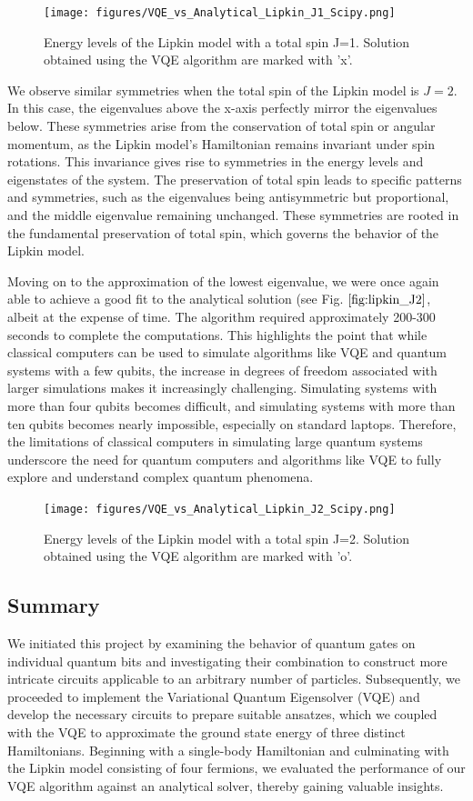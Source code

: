\documentclass[onecolumn,10pt,cleanfoot]{asme2ej}
\begin{document}
\begin{figure}[H]
  \centering
	\texttt{[image: figures/VQE\_vs\_Analytical\_Lipkin\_J1\_Scipy.png]}
	\caption{Energy levels of the Lipkin model with a total spin J=1. Solution obtained using the VQE algorithm are marked with 'x'.}
  \label{fig:lipkin_J1}
\end{figure}

We observe similar symmetries when the total spin of the Lipkin model is $J=2$. In this case, the eigenvalues above the x-axis perfectly mirror the eigenvalues below. These symmetries arise from the conservation of total spin or angular momentum, as the Lipkin model's Hamiltonian remains invariant under spin rotations. This invariance gives rise to symmetries in the energy levels and eigenstates of the system. The preservation of total spin leads to specific patterns and symmetries, such as the eigenvalues being antisymmetric but proportional, and the middle eigenvalue remaining unchanged. These symmetries are rooted in the fundamental preservation of total spin, which governs the behavior of the Lipkin model.

Moving on to the approximation of the lowest eigenvalue, we were once again able to achieve a good fit to the analytical solution (see Fig. $\ref{fig:lipkin_J2}$, albeit at the expense of time. The algorithm required approximately 200-300 seconds to complete the computations. This highlights the point that while classical computers can be used to simulate algorithms like VQE and quantum systems with a few qubits, the increase in degrees of freedom associated with larger simulations makes it increasingly challenging. Simulating systems with more than four qubits becomes difficult, and simulating systems with more than ten qubits becomes nearly impossible, especially on standard laptops. Therefore, the limitations of classical computers in simulating large quantum systems underscore the need for quantum computers and algorithms like VQE to fully explore and understand complex quantum phenomena.

\begin{figure}[H]
  \centering
	\texttt{[image: figures/VQE\_vs\_Analytical\_Lipkin\_J2\_Scipy.png]}
	\caption{Energy levels of the Lipkin model with a total spin J=2. Solution obtained using the VQE algorithm are marked with 'o'.}
  \label{fig:lipkin_J2}
\end{figure}

\subsection{Summary}
We initiated this project by examining the behavior of quantum gates on individual quantum bits and investigating their combination to construct more intricate circuits applicable to an arbitrary number of particles. Subsequently, we proceeded to implement the Variational Quantum Eigensolver (VQE) and develop the necessary circuits to prepare suitable ansatzes, which we coupled with the VQE to approximate the ground state energy of three distinct Hamiltonians. Beginning with a single-body Hamiltonian and culminating with the Lipkin model consisting of four fermions, we evaluated the performance of our VQE algorithm against an analytical solver, thereby gaining valuable insights.
\end{document}
